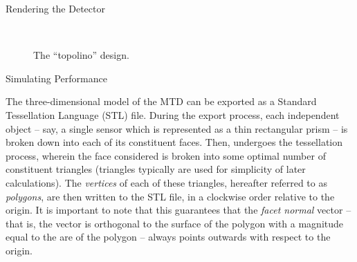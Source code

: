 \documentclass[oneside,12pt,final]{sty/ucthesis-CA2012}
\begin{document}
\begin{mainmatter}
\begin{section}{Rendering the Detector}
\begin{figure}[htb]
\label{fig:topolino}
\begin{center}
\\
\quad
{}
\end{center}
\caption{The ``topolino'' design.}
\end{figure}

\end{section}

\begin{section}{Simulating Performance}

The three-dimensional model of the MTD can be exported as a Standard Tessellation Language (STL) file. During the export process, each independent object -- say, a single sensor which is represented as a thin rectangular prism -- is broken down into each of its constituent faces. Then, undergoes the tessellation process, wherein the face considered is broken into some optimal number of constituent triangles (triangles typically are used for simplicity of later calculations). The \textit{vertices} of each of these triangles, hereafter referred to as \textit{polygons}, are then written to the STL file, in a clockwise order relative to the origin. It is important to note that this guarantees that the \textit{facet normal} vector -- that is, the vector is orthogonal to the surface of the polygon with a magnitude equal to the are of the polygon -- always points outwards with respect to the origin.


\end{section}
\end{mainmatter}
\end{document}
